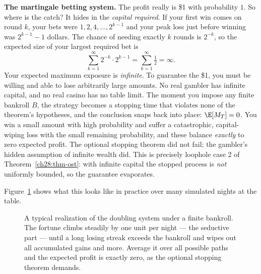 \begin{paradoxbox}
\textbf{The martingale betting system.} The profit really is \$1 with probability $1$. So where is the
catch? It hides in the \emph{capital required}. If your first win comes on round $k$, your bets were
$1, 2, 4, \dots, 2^{k-1}$ and your peak loss just before winning was $2^{k-1} - 1$ dollars. The chance
of needing exactly $k$ rounds is $2^{-k}$, so the expected size of your largest required bet is
\[
  \sum_{k=1}^{\infty} 2^{-k}\cdot 2^{k-1} = \sum_{k=1}^{\infty}\tfrac12 = \infty.
\]
Your expected maximum exposure is \emph{infinite}. To guarantee the \$1, you must be willing and able
to lose arbitrarily large amounts. No real gambler has infinite capital, and no real casino has no
table limit. The moment you impose any finite bankroll $B$, the strategy becomes a stopping time that
violates none of the theorem's hypotheses, and the conclusion snaps back into place: $\E[M_T] = 0$. You
win a small amount with high probability and suffer a catastrophic, capital-wiping loss with the small
remaining probability, and these balance \emph{exactly} to zero expected profit. The optional stopping
theorem did not fail; the gambler's hidden assumption of infinite wealth did. This is precisely loophole
case 2 of Theorem~\ref{ch28:thm-ost}: with infinite capital the stopped process is \emph{not}
uniformly bounded, so the guarantee evaporates.
\end{paradoxbox}

Figure~\ref{ch28:fig-doubling} shows what this looks like in practice over many simulated nights at
the table.

\begin{figure}[H]
\centering
{}
\caption{A typical realization of the doubling system under a finite bankroll. The fortune climbs
steadily by one unit per night --- the seductive part --- until a long losing streak exceeds the
bankroll and wipes out all accumulated gains and more. Average it over all possible paths and the
expected profit is exactly zero, as the optional stopping theorem demands.}
\label{ch28:fig-doubling}
\end{figure}

